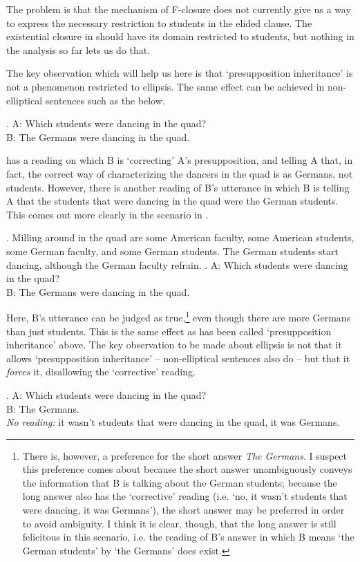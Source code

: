 \documentclass[doublespace]{umthesis}
\begin{document}
The problem is that the mechanism of F-closure does not currently give us a way to express the necessary restriction to students in the elided clause.
The existential closure in \Last[c] should have its domain restricted to students, but nothing in the analysis so far lets us do that.

The key observation which will help us here is that `presupposition inheritance' is not a phenomenon restricted to ellipsis.
The same effect can be achieved in non-elliptical sentences such as the below.

\ex. 	A: Which students were dancing in the quad?\\
	B: The Germans were dancing in the quad.
	
\Last has a reading on which B is `correcting' A's presupposition, and telling A that, in fact, the correct way of characterizing the dancers in the quad is as Germans, not students.
However, there is another reading of B's utterance in which B is telling A that the students that were dancing in the quad were the German students.
This comes out more clearly in the scenario in \Next.

\ex. 	Milling around in the quad are some American faculty, some American students, some German faculty, and some German students.
The German students start dancing, although the German faculty refrain.
	\a. A: Which students were dancing in the quad?\\
	B: The Germans were dancing in the quad.
	
Here, B's utterance can be judged as true,\footnote{There is, however, a preference for the short answer {\it The Germans}.
I suspect this preference comes about because the short answer unambiguously conveys the information that B is talking about the German students; because the long answer also has the `corrective' reading (i.e. `no, it wasn't students that were dancing, it was Germans'), the short answer may be preferred in order to avoid ambiguity.
I think it is clear, though, that the long answer is still felicitous in this scenario, i.e. the reading of B's answer in which B means `the German students' by `the Germans' does exist.} 
even though there are more Germans than just students.
This is the same effect as has been called `presupposition inheritance' above.
The key observation to be made about ellipsis is not that it allows `presupposition inheritance' -- non-elliptical sentences also do -- but that it \emph{forces} it, disallowing the `corrective' reading.

\ex. 	A: Which students were dancing in the quad?\\
	B: The Germans.\\
	{\it No reading:} it wasn't students that were dancing in the quad, it was Germans.
	
\end{document}
